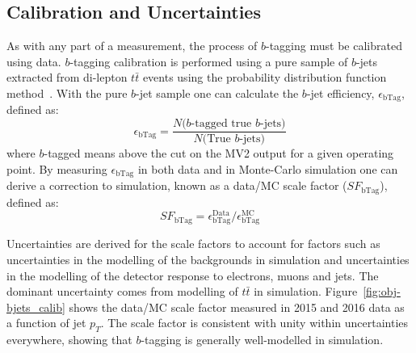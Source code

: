 \subsection{Calibration and Uncertainties}
\label{sec:obj-bjets_calib}

As with any part of a measurement, the process of $b$-tagging must be calibrated using data.
$b$-tagging calibration is performed using a pure sample of $b$-jets extracted from di-lepton $t\bar{t}$ events
using the probability distribution function method~\cite{obj-bjets_calib_tech,obj-bjets_calib_plots}.
With the pure $b$-jet sample one can calculate the $b$-jet efficiency, $\epsilon_{\text{bTag}}$, defined as:
\begin{equation}
 \epsilon_{\text{bTag}} = \frac{N(\text{$b$-tagged true $b$-jets)}}{N(\text{True $b$-jets)}}
\end{equation}
where $b$-tagged means above the cut on the MV2 output for a given operating point.
By measuring $\epsilon_{\text{bTag}}$ in both data and in Monte-Carlo simulation one can derive
a correction to simulation, known as a data/MC scale factor ($SF_{\text{bTag}}$), defined as:
\begin{equation}
 SF_{\text{bTag}} = \epsilon_{\text{bTag}}^{\text{Data}}/\epsilon_{\text{bTag}}^{\text{MC}}
\end{equation}
\vspace{-1em}

Uncertainties are derived for the scale factors 
to account for factors such as
uncertainties in the modelling of the backgrounds in simulation and
uncertainties in the modelling of the detector response to electrons, muons and jets.
The dominant uncertainty comes from modelling of $t\bar{t}$ in simulation.
Figure~\ref{fig:obj-bjets_calib} shows the data/MC scale factor measured in 2015 and 2016 data as a function of jet $p_T$.
The scale factor is consistent with unity within uncertainties everywhere, showing that $b$-tagging is generally well-modelled in simulation.

